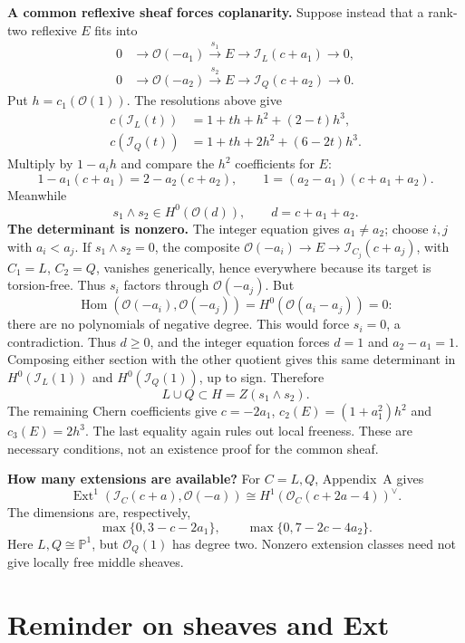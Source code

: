 \documentclass[11pt,a4paper]{article}
\begin{document}
\textbf{A common reflexive sheaf forces
coplanarity.}
Suppose instead that a rank-two
reflexive $E$ fits into
$$
\begin{aligned}
0&\to\mathcal{O}(-a_1)\xrightarrow{s_1}E
\to\mathcal{I}_L(c+a_1)\to0,\\
0&\to\mathcal{O}(-a_2)\xrightarrow{s_2}E
\to\mathcal{I}_Q(c+a_2)\to0.
\end{aligned}
$$
Put $h=c_1(\mathcal{O}(1))$.
The resolutions above give
$$
\begin{aligned}
c(\mathcal{I}_L(t))
&=1+th+h^2+(2-t)h^3,\\
c(\mathcal{I}_Q(t))
&=1+th+2h^2+(6-2t)h^3.
\end{aligned}
$$
Multiply by $1-a_i h$ and compare
the $h^2$ coefficients for $E$:
$$
1-a_1(c+a_1)=2-a_2(c+a_2),
\qquad
1=(a_2-a_1)(c+a_1+a_2).
$$
Meanwhile
$$
s_1\wedge s_2\in H^0(\mathcal{O}(d)),
\qquad d=c+a_1+a_2.
$$
\textbf{The determinant is nonzero.}
The integer equation gives $a_1\ne a_2$;
choose $i,j$ with $a_i<a_j$.
If $s_1\wedge s_2=0$, the composite
$\mathcal{O}(-a_i)\to E\to
\mathcal{I}_{C_j}(c+a_j)$, with
$C_1=L$, $C_2=Q$, vanishes generically,
hence everywhere because its target
is torsion-free. Thus $s_i$ factors
through $\mathcal{O}(-a_j)$. But
$$
\operatorname{Hom}(\mathcal{O}(-a_i),
\mathcal{O}(-a_j))
=H^0(\mathcal{O}(a_i-a_j))=0:
$$
there are no polynomials of negative
degree. This would force $s_i=0$,
a contradiction.
Thus $d\geq0$, and the integer equation
forces $d=1$ and $a_2-a_1=1$.
Composing either section with the other
quotient gives this same determinant
in $H^0(\mathcal{I}_L(1))$ and
$H^0(\mathcal{I}_Q(1))$, up to sign.
Therefore
$$
\boxed{L\cup Q\subset H=Z(s_1\wedge s_2).}
$$
The remaining Chern coefficients give
$c=-2a_1$, $c_2(E)=(1+a_1^2)h^2$ and
$c_3(E)=2h^3$. The last equality again
rules out local freeness. These are
necessary conditions, not an existence
proof for the common sheaf.

\textbf{How many extensions are available?}
For $C=L,Q$, Appendix~A gives
$$
\operatorname{Ext}^1
(\mathcal{I}_C(c+a),\mathcal{O}(-a))
\cong H^1(\mathcal{O}_C(c+2a-4))^\vee.
$$
The dimensions are, respectively,
$$
\max\{0,3-c-2a_1\},\qquad
\max\{0,7-2c-4a_2\}.
$$
Here $L,Q\cong\mathbb{P}^1$, but
$\mathcal{O}_Q(1)$ has degree two.
Nonzero extension classes need not give
locally free middle sheaves.

\newpage
\appendix
\section{Reminder on sheaves and Ext}
\end{document}
